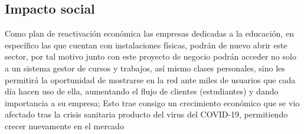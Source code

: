\subsection{Impacto social}

Como plan de reactivación económica las empresas dedicadas a la educación, en específico las que cuentan con instalaciones físicas, podrán de nuevo abrir este sector, por tal motivo junto con este proyecto de negocio podrán acceder no solo a un sistema gestor de cursos y trabajos, así mismo clases personales, sino les permitirá la oportunidad de mostrarse en la red ante miles de usuarios que cada día hacen uso de ella, aumentando el flujo de clientes (estudiantes) y dando importancia a su empresa; Esto trae consigo un crecimiento económico que se vio afectado tras la crisis sanitaria producto del virus del COVID-19, permitiendo crecer nuevamente en el mercado